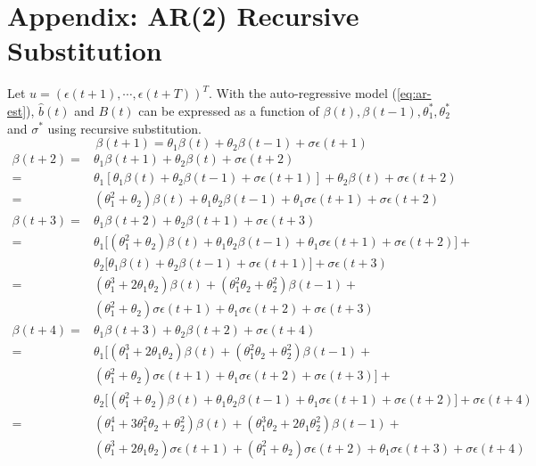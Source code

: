 
\section{Appendix: AR(2) Recursive Substitution}\label{apx:recursiveSubstitution}

    Let $u = (\epsilon(t+1), \cdots, \epsilon(t+T))^T$. With the auto-regressive model (\ref{eq:ar-est}), $\hat{b}(t)$ and $B(t)$ can be expressed as a function of $\beta(t), \beta(t-1), \theta_1^*, \theta_2^*$ and $\sigma^*$ using recursive substitution. 
    \[\beta(t+1) = \theta_1\beta(t)+\theta_2\beta(t-1)+\sigma\epsilon(t+1)\]
    \[\begin{split}
        \beta(t+2) 
        = & \theta_1\beta(t+1)+\theta_2\beta(t)+\sigma\epsilon(t+2) \\
        = & \theta_1[\theta_1\beta(t)+\theta_2\beta(t-1)+\sigma\epsilon(t+1)]+
            \theta_2\beta(t)+\sigma\epsilon(t+2) \\
        = & (\theta_1^2+\theta_2)\beta(t)+\theta_1\theta_2\beta(t-1)+
            \theta_1\sigma\epsilon(t+1)+\sigma\epsilon(t+2)
    \end{split}\]
    \[\begin{split}
        \beta(t+3) 
        = & \theta_1\beta(t+2)+\theta_2\beta(t+1)+\sigma\epsilon(t+3) \\
        = & \theta_1\big[(\theta_1^2+\theta_2)\beta(t)+\theta_1\theta_2\beta(t-1)+
            \theta_1\sigma\epsilon(t+1)+\sigma\epsilon(t+2)\big]+ \\
          & \theta_2\big[\theta_1\beta(t)+\theta_2\beta(t-1)+\sigma\epsilon(t+1)\big]+\sigma\epsilon(t+3) \\
        = & (\theta_1^3+2\theta_1\theta_2)\beta(t) + (\theta_1^2\theta_2+\theta_2^2)\beta(t-1) + \\
          & (\theta_1^2+\theta_2)\sigma\epsilon(t+1) + \theta_1\sigma\epsilon(t+2) +
            \sigma\epsilon(t+3)
    \end{split}\]
    \[\begin{split}
        \beta(t+4) 
        = & \theta_1\beta(t+3)+\theta_2\beta(t+2)+\sigma\epsilon(t+4) \\
        = & \theta_1\big[ (\theta_1^3+2\theta_1\theta_2)\beta(t) + (\theta_1^2\theta_2+\theta_2^2)\beta(t-1) + \\
          & (\theta_1^2+\theta_2)\sigma\epsilon(t+1) + \theta_1\sigma\epsilon(t+2) +
            \sigma\epsilon(t+3)\big]+\\
          & \theta_2\big[ (\theta_1^2+\theta_2)\beta(t)+\theta_1\theta_2\beta(t-1)+
            \theta_1\sigma\epsilon(t+1)+\sigma\epsilon(t+2)\big]+\sigma\epsilon(t+4) \\
        = & (\theta_1^4+3\theta_1^2\theta_2+\theta_2^2)\beta(t)+
            (\theta_1^3\theta_2+2\theta_1\theta_2^2)\beta(t-1)+\\
           & (\theta_1^3+2\theta_1\theta_2)\sigma\epsilon(t+1)+(\theta_1^2+\theta_2)\sigma\epsilon(t+2)+\theta_1\sigma\epsilon(t+3)+\sigma\epsilon(t+4)
    \end{split}\]

